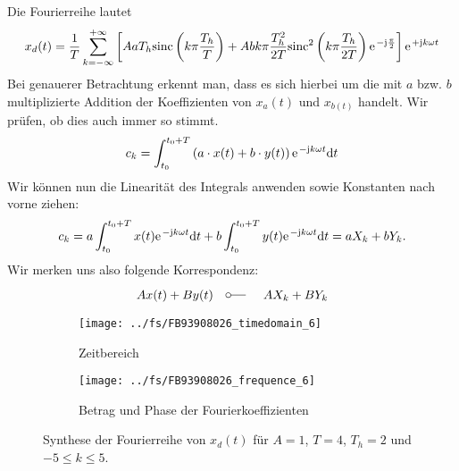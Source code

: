 \documentclass[11pt,a4paper,DIV=12]{scrartcl}
\newcommand{\sinc}{\mathrm{sinc}}
\begin{document}
%
%
%
Die Fourierreihe lautet
%
\begin{gather}
	x_d(t)=\frac{1}{T}\sum_{k=-\infty}^{+\infty}\left[AaT_h\sinc\left(k\pi\frac{T_h}{T}\right)+Abk\pi\frac{T_h^2}{2T}\sinc^2\left(k\pi\frac{T_h}{2T}\right)\e^{-\im\frac{\pi}{2}}\right]\e^{+\im k \omega t}
\end{gather}
%
Bei genauerer Betrachtung erkennt man, dass es sich hierbei um die mit $a$ bzw. $b$
multiplizierte Addition der Koeffizienten von $x_a(t)$ und $x_{b(t)}$ handelt.
%
Wir prüfen, ob dies auch immer so stimmt.
%
\begin{align}
	c_k=\int_{t_0}^{t_0+T}\left (a\cdot x(t)+b\cdot y(t)\right )\e^{-\im k \omega t}\diff t
\end{align}
%
Wir können nun die Linearität des Integrals anwenden sowie Konstanten nach vorne ziehen:
\begin{align}
	c_k=a\int_{t_0}^{t_0+T}x(t)\e^{-\im k \omega t}\diff t+b\int_{t_0}^{t_0+T}y(t)\e^{-\im k \omega t}\diff t=aX_k+bY_k.
\end{align}
%
Wir merken uns also folgende Korrespondenz:
%
\begin{align}
	Ax(t)+By(t)\quad\fourier\quad AX_k+BY_k
\end{align}
%
%
\begin{figure}
	\centering
	\begin{subfigure}{\textwidth}
		\texttt{[image: ../fs/FB93908026\_timedomain\_6]}
		\caption{Zeitbereich}
	\end{subfigure}
	\begin{subfigure}{\textwidth}
		\texttt{[image: ../fs/FB93908026\_frequence\_6]}
		\caption{Betrag und Phase der Fourierkoeffizienten}
	\end{subfigure}
	\caption{Synthese der Fourierreihe von $x_d(t)$ für $A=1$, $T=4$, $T_h=2$ und
		$-5\leq k\leq5$.}
\end{figure}
\newpage
\end{document}

